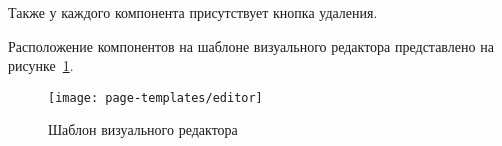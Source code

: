 Также у каждого компонента присутствует кнопка удаления.

Расположение компонентов на шаблоне визуального редактора
представлено на рисунке~\ref{f:editor-template}.

\begin{figure}[ht]
	\centering
	\vspace{0.5cm}
	\texttt{[image: page-templates/editor]}
	\caption{Шаблон визуального редактора}
	\label{f:editor-template}
	\vspace{0.5cm}
\end{figure}


